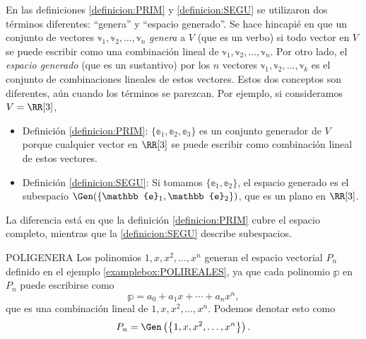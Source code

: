 En las definiciones \ref{definicion:PRIM} y \ref{definicion:SEGU} se utilizaron dos términos diferentes: “genera” y “espacio generado”. Se hace hincapié en que un conjunto de vectores $\mathbb{v}_1, \mathbb{v}_2, \dots, \mathbb{v}_n$ \emph{genera} a $V$ (que es un verbo) si todo vector en $V$ se puede escribir como una combinación lineal de $\mathbb{v}_1, \mathbb{v}_2, \dots, \mathbb{v}_n$. Por otro lado, el \emph{espacio generado} (que es un sustantivo) por los $n$ vectores $\mathbb{v}_1, \mathbb{v}_2, \dots, \mathbb{v}_k$ es el conjunto de combinaciones lineales de estos vectores. Estos dos conceptos son diferentes, aún cuando los términos se parezcan. Por ejemplo, si consideramos $V = \RR[3]$,
\begin{itemize}
    \item Definición \ref{definicion:PRIM}: $\{\mathbb{e}_1, \mathbb{e}_2, \mathbb{e}_3\}$ es un conjunto generador de $V$ porque cualquier vector en $\RR[3]$ se puede escribir como combinación lineal de estos vectores.
    \item Definición \ref{definicion:SEGU}: Si tomamos $\{\mathbb{e}_1, \mathbb{e}_2\}$, el espacio generado es el subespacio $\Gen (\{\mathbb{e}_1, \mathbb{e}_2\})$, que es un plano en $\RR[3]$.
\end{itemize}
La diferencia está en que la definición \ref{definicion:PRIM} cubre el espacio completo, mientras que la \ref{definicion:SEGU} describe subespacios.

\begin{examplebox}{}{POLIGENERA}
    Los polinomios $1, x, x^2, \dots, x^n$ generan el espacio vectorial $P_n$ definido en el ejemplo \ref{examplebox:POLIREALES}, ya que cada polinomio $\mathbb{p}$ en $P_n$ puede escribirse como
    $$\mathbb{p} = a_0 + a_1x + \cdots + a_nx^n,$$
    que es una combinación lineal de $1, x, x^2, \dots, x^n$. Podemos denotar esto como
    $$P_n = \Gen\left(\left\{1, x, x^2, \dots, x^n\right\}\right).$$
\end{examplebox}

\newpage


